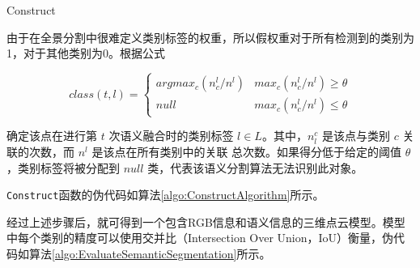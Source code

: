 \begin{enumerate}
	      \begin{algorithm}[htbp]
		      \SetAlgoLined
		      \caption{Construct}
		      \label{algo:ConstructAlgorithm}
	      \end{algorithm}

	      由于在全景分割中很难定义类别标签的权重\cite{EfficientPS}，所以假权重对于所有检测到的类别为1，对于其他类别为0。根据公式

	      \begin{equation}
		      class(t, l)=\left\{
		      \begin{array}{ll}
			      argmax_c(n_c^l/n^l) & max_c(n_c^l/n^l) \geq \theta \\
			      null                & max_c(n_c^l/n^l) \leq \theta
		      \end{array}\right.
	      \end{equation}

	      确定该点在进行第 $t$ 次语义融合时的类别标签 $l \in L$。其中，$n_l^c$ 是该点与类别 $c$ 关联的次数，而 $n^{l}$ 是该点在所有类别中的关联
	      总次数。如果得分低于给定的阈值 $\theta$，类别标签将被分配到 $null$ 类，代表该语义分割算法无法识别此对象。

\end{enumerate}

\par \texttt{Construct}函数的伪代码如算法\ref{algo:ConstructAlgorithm}所示。

\par 经过上述步骤后，就可得到一个包含RGB信息和语义信息的三维点云模型。模型中每个类别的精度可以使用交并比（Intersection Over Union，IoU）衡量，伪代码如算法\ref{algo:EvaluateSemanticSegmentation}所示。

